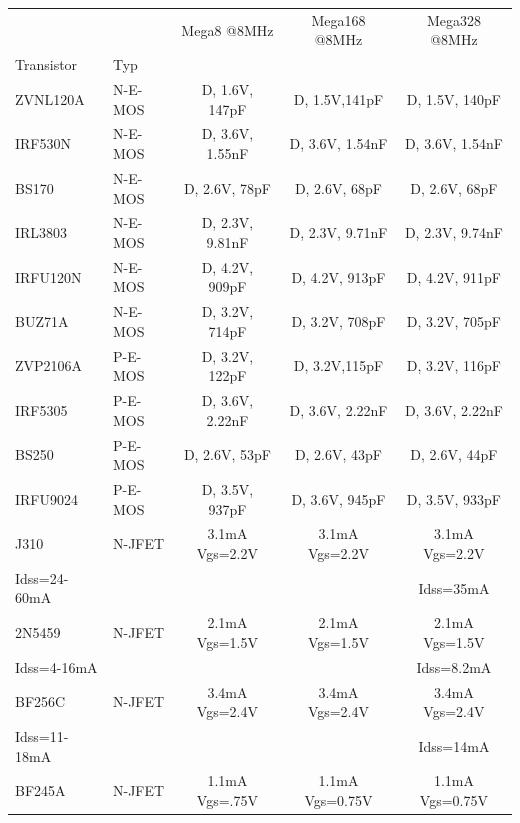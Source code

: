 \begin{table}[H]
  \begin{center}
    \begin{tabular}{| l | l | c | c | c |}
    \hline
             &         & Mega8 @8MHz       & Mega168 @8MHz    & Mega328 @8MHz \\
 Transistor  & Typ     &                  &                  &               \\
    \hline
    \hline
ZVNL120A     & N-E-MOS & D, 1.6V, 147pF   & D, 1.5V,141pF    & D, 1.5V, 140pF \\
    \hline
IRF530N      & N-E-MOS & D, 3.6V, 1.55nF  & D, 3.6V, 1.54nF  & D, 3.6V, 1.54nF \\
    \hline
BS170        & N-E-MOS & D, 2.6V, 78pF    & D, 2.6V, 68pF    & D, 2.6V, 68pF \\
    \hline
IRL3803      & N-E-MOS & D, 2.3V, 9.81nF  & D, 2.3V, 9.71nF  & D, 2.3V, 9.74nF \\
    \hline
IRFU120N     & N-E-MOS & D, 4.2V, 909pF   & D, 4.2V, 913pF   & D, 4.2V, 911pF \\
    \hline
BUZ71A       & N-E-MOS & D, 3.2V, 714pF   & D, 3.2V, 708pF   & D, 3.2V, 705pF \\
    \hline
ZVP2106A     & P-E-MOS & D, 3.2V, 122pF   & D, 3.2V,115pF    & D, 3.2V, 116pF \\
    \hline
IRF5305      & P-E-MOS & D, 3.6V, 2.22nF  & D, 3.6V, 2.22nF  & D, 3.6V, 2.22nF \\
    \hline
BS250        & P-E-MOS & D, 2.6V, 53pF    & D, 2.6V, 43pF    & D, 2.6V, 44pF \\
    \hline
IRFU9024     & P-E-MOS & D, 3.5V, 937pF   & D, 3.6V, 945pF   & D, 3.5V, 933pF \\
    \hline
J310         & N-JFET  & 3.1mA Vgs=2.2V   & 3.1mA Vgs=2.2V   & 3.1mA Vgs=2.2V \\
Idss=24-60mA &         &                  &                  & Idss=35mA      \\
    \hline
2N5459       & N-JFET  & 2.1mA Vgs=1.5V   & 2.1mA Vgs=1.5V   & 2.1mA Vgs=1.5V \\
Idss=4-16mA &          &                  &                  & Idss=8.2mA     \\
    \hline
BF256C       & N-JFET  & 3.4mA Vgs=2.4V   & 3.4mA Vgs=2.4V   & 3.4mA Vgs=2.4V \\
Idss=11-18mA &         &                  &                  & Idss=14mA      \\
    \hline
BF245A       & N-JFET  & 1.1mA Vgs=.75V   & 1.1mA Vgs=0.75V  & 1.1mA Vgs=0.75V \\

\end{tabular}
\end{center}
\end{table}
